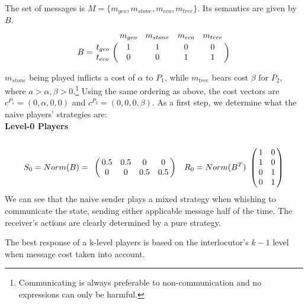 \documentclass[10pt]{article}
\begin{document}
The set of messages is $M=\{m_{geo}, m_{stone}, m_{eco}, m_{tree}\}$. Its semantics are given by $B$.
 \begin{equation*}
 B =
 \bordermatrix{
            & m_{geo} & m_{stone} & m_{eco} & m_{tree}    \cr
   t_{geo}  &       1 &         1 & 0       & 0 \cr
   t_{eco}  &       0 &         0 & 1       & 1
 }
 \end{equation*}

$m_{stone}$ being played inflicts a cost of $\alpha$ to $P_1$, while $m_{tree}$ bears cost $\beta$ for $P_2$, where $a>\alpha,\beta>0$.\footnote{Communicating is always preferable to non-communication and no expressions can only be harmful.} Using the same ordering as above, the cost vectors are $c^{P_1}=(0,\alpha,0,0)$ and $c^{P_2}=(0,0,0,\beta)$. As a first step, we determine what the naive players' strategies are:\\
\textbf{Level-0 Players}\\
\begin{equation*}
S_0=Norm(B)=
\bordermatrix{
            & & & &    \cr
 &       0.5 &         0.5 & 0       & 0 \cr
 &       0 &         0 & 0.5       & 0.5
 }\quad
R_0=Norm(B^T)
\bordermatrix{
            &  & \cr
    & 1 & 0 \cr
     & 1 & 0 \cr
     & 0 & 1 \cr
     & 0 & 1 \cr
 }
\end{equation*}
We can see that the naive sender plays a mixed strategy when whishing to communicate the state, sending either applicable message half of the time. The receiver's actions are clearly determined by a pure strategy.

The best response of a k-level players is based on the interlocutor's $k-1$ level when message cost taken into account.
\end{document}
